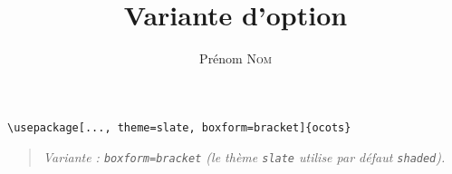 \documentclass[11pt]{ocots-book}
\title{Variante d'option}
\author{Prénom \textsc{Nom}}
\newcommand{\ocotsvariantnote}[1]{\begin{quote}\itshape Variante : #1\end{quote}}
\begin{document}
\maketitle

\begin{lstlisting}
\usepackage[..., theme=slate, boxform=bracket]{ocots}
\end{lstlisting}
\ocotsvariantnote{\texttt{boxform=bracket} (le th\`eme \texttt{slate} utilise par d\'efaut \texttt{shaded}).}

\end{document}
